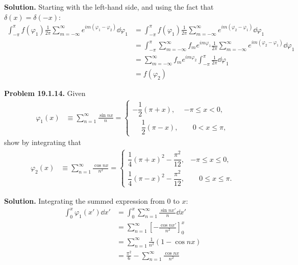 \documentclass{article}
\begin{document}
\textbf{Solution.} Starting with the left-hand side, and using the fact that $\delta(x) = \delta(-x)$:
\begin{equation*}
\begin{aligned}
    \int_{-\pi}^\pi f(\varphi_1)\frac{1}{2\pi}\sum_{m=-\infty}^\infty e^{im(\varphi_1-\varphi_2)}\dd\varphi_1 &= \int_{-\pi}^\pi f(\varphi_1)\frac{1}{2\pi}\sum_{m=-\infty}^\infty e^{im(\varphi_2-\varphi_1)}\dd\varphi_1 \\
    &= \int_{-\pi}^\pi \sum_{m=-\infty}^{\infty} f_m e^{im\varphi_1}\frac{1}{2\pi}\sum_{m=-\infty}^\infty e^{im(\varphi_2-\varphi_1)}\dd\varphi_1 \\
    &= \sum_{m=-\infty}^\infty f_m e^{im\varphi_2} \int_{-\pi}^\pi \frac{1}{2\pi}\dd\varphi_1 \\
    &= f(\varphi_2)
\end{aligned}
\end{equation*}
    
\hrulefill

\textbf{Problem 19.1.14.} Given
\begin{equation*}
\begin{aligned}
    \varphi_1(x) &\equiv \sum_{n=1}^\infty \frac{\sin nx}{n} =
    \begin{cases} 
      -\dfrac{1}{2}(\pi+x), &-\pi \leq x< 0, \\[1em]
      \phantom{-}\dfrac{1}{2}(\pi-x), &\phantom{-}0 <x\leq\pi,
   \end{cases}
\end{aligned}
\end{equation*}
show by integrating that
\begin{equation*}
\begin{aligned}
    \varphi_2(x) &\equiv \sum_{n=1}^\infty \frac{\cos nx}{n^2} =
    \begin{cases} 
      \dfrac{1}{4}(\pi+x)^2-\dfrac{\pi^2}{12}, &-\pi \leq x \leq 0, \\[1em]
      \dfrac{1}{4}(\pi-x)^2-\dfrac{\pi^2}{12}, &\phantom{-}0\leq x\leq\pi.
   \end{cases}
\end{aligned}
\end{equation*}

\textbf{Solution.} Integrating the summed expression from 0 to $x$:
\begin{equation*}
\begin{aligned}
    \int_0^x \varphi_1(x') \dd x' &= \int_0^x \sum_{n=1}^\infty \frac{\sin nx'}{n} \dd x' \\
    &= \sum_{n=1}^\infty \left[-\frac{\cos nx'}{n^2}\right]_0^x \\
    &= \sum_{n=1}^\infty \frac{1}{n^2}\left(1 - \cos nx\right) \\
    &= \frac{\pi^2}{6} - \sum_{n=1}^\infty \frac{\cos nx}{n^2}
\end{aligned}
\end{equation*}
\end{document}
